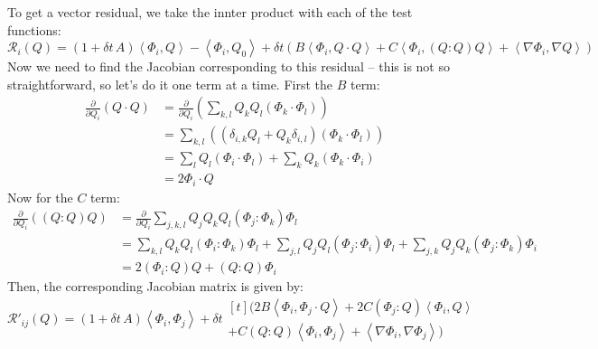 \documentclass[reqno]{article}
\begin{document}
To get a vector residual, we take the innter product with each of the test functions:
\begin{equation}
    \mathcal{R}_i(Q)
    =
    (1 + \delta t \, A) \left< \Phi_i, Q \right>
    - \left< \Phi_i, Q_0 \right>
    + \delta t
    \left(
        B \left< \Phi_i, Q \cdot Q \right>
        + C \left< \Phi_i, (Q : Q) Q \right>
        + \left< \nabla \Phi_i, \nabla Q \right>
    \right)
\end{equation}
Now we need to find the Jacobian corresponding to this residual -- this is not so straightforward, so let's do it one term at a time.
First the $B$ term:
\begin{equation}
    \begin{split}
        \frac{\partial}{\partial Q_i} (Q \cdot Q)
        &= 
        \frac{\partial}{\partial Q_i} \left( \sum_{k, l} Q_k Q_l (\Phi_k \cdot \Phi_l) \right) \\
        &=
        \sum_{k, l} \left( (\delta_{i, k} Q_l + Q_k \delta_{i, l}) (\Phi_k \cdot \Phi_l) \right) \\
        &=
        \sum_l Q_l (\Phi_i \cdot \Phi_l) + \sum_k Q_k (\Phi_k \cdot \Phi_i) \\
        &=
        2 \Phi_i \cdot Q
    \end{split}
\end{equation}
Now for the $C$ term:
\begin{equation}
    \begin{split}
        \frac{\partial}{\partial Q_i} \left( (Q : Q) Q \right)
        &=
        \frac{\partial}{\partial Q_i} \sum_{j, k, l} Q_j Q_k Q_l \left( \Phi_j : \Phi_k \right) \Phi_l \\
        &=
        \sum_{k, l} Q_k Q_l \left( \Phi_i : \Phi_k \right) \Phi_l
        + \sum_{j, l} Q_j Q_l \left( \Phi_j : \Phi_i \right) \Phi_l
        + \sum_{j, k} Q_j Q_k \left( \Phi_j : \Phi_k \right) \Phi_i \\
        &=
        2 \left( \Phi_i : Q \right) Q + \left( Q : Q \right) \Phi_i
    \end{split}
\end{equation}
Then, the corresponding Jacobian matrix is given by:
\begin{equation}
    \mathcal{R}'_{ij} (Q)
    =
    \left(1 + \delta t \, A\right) \left< \Phi_i, \Phi_j \right>
    + \delta t 
    \begin{multlined}[t]
        \bigl(
        2 B \left< \Phi_i, \Phi_j \cdot Q \right>
        + 2 C \left( \Phi_j : Q \right) \left< \Phi_i, Q \right> \\
        + C \left( Q : Q \right) \left< \Phi_i, \Phi_j \right>
        + \left< \nabla \Phi_i, \nabla \Phi_j \right>
        \bigr)
    \end{multlined}
\end{equation}
\end{document}
